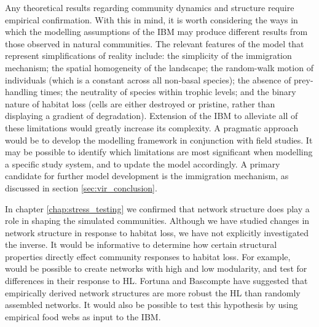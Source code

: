 Any theoretical results regarding community dynamics and structure require empirical confirmation. With this in mind, it is worth considering the ways in which the modelling assumptions of the IBM may produce different results from those observed in natural communities. The relevant features of the model that represent simplifications of reality include: the simplicity of the immigration mechanism; the spatial homogeneity of the landscape; the random-walk motion of individuals (which is a constant across all non-basal species); the absence of prey-handling times; the neutrality of species within trophic levels; and the binary nature of habitat loss (cells are either destroyed or pristine, rather than displaying a gradient of degradation). Extension of the IBM to alleviate all of these limitations would greatly increase its complexity. A pragmatic approach would be to develop the modelling framework in conjunction with field studies. It may be possible to identify which limitations are most significant when modelling a specific study system, and to update the model accordingly. A primary candidate for further model development is the immigration mechanism, as discussed in section \ref{sec:vir_conclusion}.

In chapter \ref{chap:stress_testing} we confirmed that network structure does play a role in shaping the simulated communities. Although we have studied changes in network structure in response to habitat loss, we have not explicitly investigated the inverse. It would be informative to determine how certain structural properties directly effect community responses to habitat loss. For example,  would be possible to create networks with high and low modularity, and test for differences in their response to HL. Fortuna and Bascompte \cite{fortuna2006habitat} have suggested that empirically derived network structures are more robust the HL than randomly assembled networks. It would also be possible to test this hypothesis by using empirical food webs as input to the IBM. 

